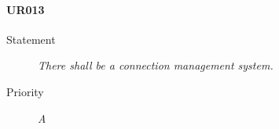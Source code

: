 \paragraph{UR013}
  \begin{description}
  \item [Statement] 
    \textit{ There shall be a connection management system.}
  \item [Priority] \textit{A}
\end{description}